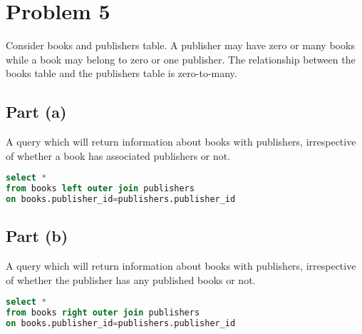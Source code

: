 \documentclass{article}
\begin{document}
\section{Problem 5}
Consider books and publishers table. A publisher may have zero or many books while a book may belong to zero or one publisher. The relationship
between the books table and the publishers table is zero-to-many.
\newpage
\subsection{Part (a)}
A query which will return information about books with publishers, irrespective of whether a book
has associated publishers or not.
\begin{lstlisting}[language=sql]
select *
from books left outer join publishers
on books.publisher_id=publishers.publisher_id
\end{lstlisting}

\subsection{Part (b)}
A query which will return information about books with publishers, irrespective of whether the
publisher has any published books or not.
\begin{lstlisting}[language=sql]
select *
from books right outer join publishers
on books.publisher_id=publishers.publisher_id
\end{lstlisting}
\end{document}
